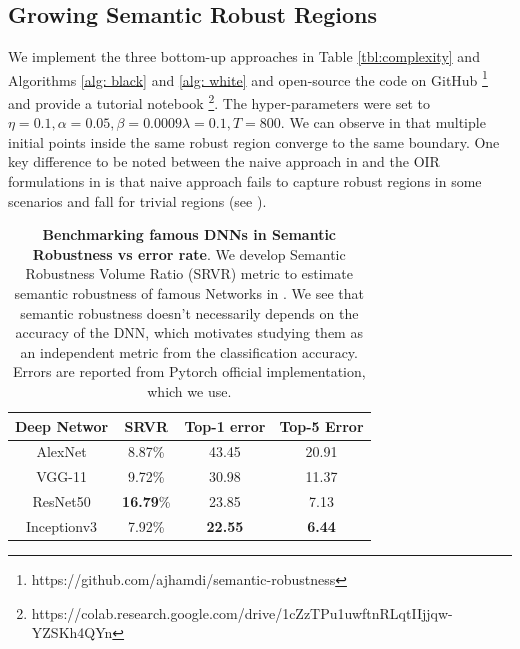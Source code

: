 \subsection{Growing Semantic Robust Regions} \label{sec:regions}
We implement the three bottom-up approaches in Table \ref{tbl:complexity} and Algorithms \ref{alg: black} and \ref{alg: white} and open-source the code on GitHub \footnote{https://github.com/ajhamdi/semantic-robustness} and provide a tutorial notebook \footnote{https://colab.research.google.com/drive/1cZzTPu1uwftnRLqtIIjjqw-YZSKh4QYn}. The hyper-parameters were set to $\eta =0.1, \alpha=0.05,  \beta=0.0009 \lambda =0.1, T =800$. We can observe in \figLabel{\ref{fig:operator}} that multiple initial points inside the same robust region converge to the same boundary. One key difference to be noted between the naive approach in \eqLabel{\ref{eq:n-loss-update-naive}} and the OIR formulations in \eqLabel{\ref{eq:n-loss-update-outer},\ref{eq:n-loss-update-grad}} is that naive approach fails to capture robust regions in some scenarios and fall for trivial regions (see \figLabel{\ref{fig:operator}}).
\begin{table}[t]
\small
\tabcolsep=0.09cm
\centering
\begin{tabular}{c|c|cc} 
\toprule
Deep Networ & SRVR & Top-1 error & Top-5 Error \\ 
\midrule
AlexNet \cite{AlexNet} & 8.87\% &43.45   &  20.91 \\
VGG-11 \cite{vgg}& 9.72\%  &30.98  &  11.37   \\
ResNet50 \cite{resnet} &  \textbf{16.79}\% & 23.85      & 7.13  \\
Inceptionv3 \cite{inception}&  7.92\% & \textbf{22.55}  & \textbf{6.44}  \\
\bottomrule
\end{tabular}
\caption{\small \textbf{Benchmarking famous DNNs in Semantic Robustness vs error rate}. We develop Semantic Robustness Volume Ratio (SRVR) metric to estimate semantic robustness of famous Networks in \secLabel{\ref{sec:application}}. We see that semantic robustness doesn't necessarily depends on the accuracy of the DNN, which motivates studying them as an independent metric from the classification accuracy. Errors are reported from Pytorch official implementation, which we use\cite{paszke2017pytorch}.}
\label{tbl:benchmarking}
\end{table}

